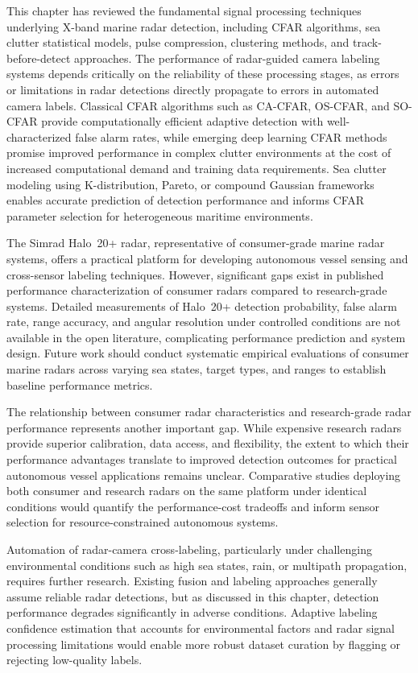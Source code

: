 This chapter has reviewed the fundamental signal processing techniques underlying X-band marine radar detection, including CFAR algorithms, sea clutter statistical models, pulse compression, clustering methods, and track-before-detect approaches. The performance of radar-guided camera labeling systems depends critically on the reliability of these processing stages, as errors or limitations in radar detections directly propagate to errors in automated camera labels. Classical CFAR algorithms such as CA-CFAR, OS-CFAR, and SO-CFAR provide computationally efficient adaptive detection with well-characterized false alarm rates, while emerging deep learning CFAR methods promise improved performance in complex clutter environments at the cost of increased computational demand and training data requirements. Sea clutter modeling using K-distribution, Pareto, or compound Gaussian frameworks enables accurate prediction of detection performance and informs CFAR parameter selection for heterogeneous maritime environments.

The Simrad Halo~20+ radar, representative of consumer-grade marine radar systems, offers a practical platform for developing autonomous vessel sensing and cross-sensor labeling techniques. However, significant gaps exist in published performance characterization of consumer radars compared to research-grade systems. Detailed measurements of Halo~20+ detection probability, false alarm rate, range accuracy, and angular resolution under controlled conditions are not available in the open literature, complicating performance prediction and system design. Future work should conduct systematic empirical evaluations of consumer marine radars across varying sea states, target types, and ranges to establish baseline performance metrics.

The relationship between consumer radar characteristics and research-grade radar performance represents another important gap. While expensive research radars provide superior calibration, data access, and flexibility, the extent to which their performance advantages translate to improved detection outcomes for practical autonomous vessel applications remains unclear. Comparative studies deploying both consumer and research radars on the same platform under identical conditions would quantify the performance-cost tradeoffs and inform sensor selection for resource-constrained autonomous systems.

Automation of radar-camera cross-labeling, particularly under challenging environmental conditions such as high sea states, rain, or multipath propagation, requires further research. Existing fusion and labeling approaches generally assume reliable radar detections, but as discussed in this chapter, detection performance degrades significantly in adverse conditions. Adaptive labeling confidence estimation that accounts for environmental factors and radar signal processing limitations would enable more robust dataset curation by flagging or rejecting low-quality labels.

